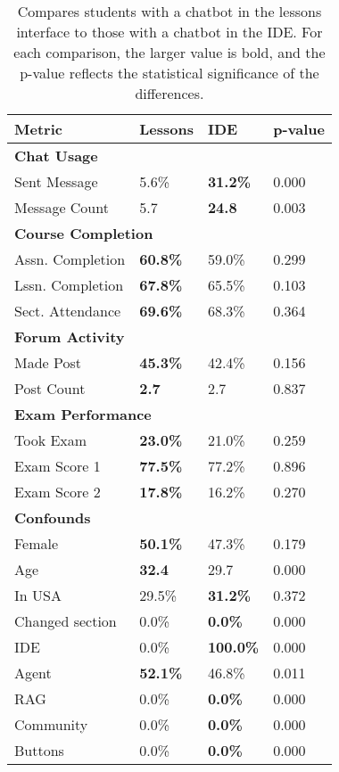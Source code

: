 \begin{table}
\centering
\begin{tabularx}{\columnwidth}{l X X X}
\toprule
\textbf{Metric} & \textbf{Lessons} & \textbf{IDE} & \textbf{p-value} \\
\midrule
\multicolumn{4}{l}{\textbf{Chat Usage}} \\
Sent Message & 5.6\% & \textbf{31.2\%} & 0.000 \\
Message Count & 5.7 & \textbf{24.8} & 0.003 \\
\midrule
\multicolumn{4}{l}{\textbf{Course Completion}} \\
Assn. Completion & \textbf{60.8\%} & 59.0\% & 0.299 \\
Lssn. Completion & \textbf{67.8\%} & 65.5\% & 0.103 \\
Sect. Attendance & \textbf{69.6\%} & 68.3\% & 0.364 \\
\midrule
\multicolumn{4}{l}{\textbf{Forum Activity}} \\
Made Post & \textbf{45.3\%} & 42.4\% & 0.156 \\
Post Count & \textbf{2.7} & 2.7 & 0.837 \\
\midrule
\multicolumn{4}{l}{\textbf{Exam Performance}} \\
Took Exam & \textbf{23.0\%} & 21.0\% & 0.259 \\
Exam Score 1 & \textbf{77.5\%} & 77.2\% & 0.896 \\
Exam Score 2 & \textbf{17.8\%} & 16.2\% & 0.270 \\
\midrule
\multicolumn{4}{l}{\textbf{Confounds}} \\
Female & \textbf{50.1\%} & 47.3\% & 0.179 \\
Age & \textbf{32.4} & 29.7 & 0.000 \\
In USA & 29.5\% & \textbf{31.2\%} & 0.372 \\
Changed section & 0.0\% & \textbf{0.0\%} & 0.000 \\
IDE & 0.0\% & \textbf{100.0\%} & 0.000 \\
Agent & \textbf{52.1\%} & 46.8\% & 0.011 \\
RAG & 0.0\% & \textbf{0.0\%} & 0.000 \\
Community & 0.0\% & \textbf{0.0\%} & 0.000 \\
Buttons & 0.0\% & \textbf{0.0\%} & 0.000 \\
\bottomrule
\end{tabularx}
\caption{Compares students with a chatbot in the lessons interface to those with a chatbot in the IDE. For each comparison, the larger value is bold, and the p-value reflects the statistical significance of the differences.}
\label{tab:placement-table}
\end{table}